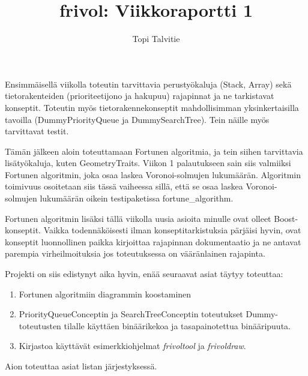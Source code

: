 \documentclass[a4paper, 11pt, finnish]{article}
\author{Topi Talvitie}
\title{frivol: Viikkoraportti 1}
\begin{document}
\maketitle

Ensimmäisellä viikolla toteutin tarvittavia perustyökaluja (Stack, Array) sekä tietorakenteiden (prioriteetijono ja hakupuu) rajapinnat ja ne tarkistavat konseptit. Toteutin myös tietorakennekonseptit mahdollisimman yksinkertaisilla tavoilla (DummyPriorityQueue ja DummySearchTree). Tein näille myös tarvittavat testit.

Tämän jälkeen aloin toteuttamaan Fortunen algoritmia, ja tein siihen tarvittavia lisätyökaluja, kuten GeometryTraits. Viikon 1 palautukseen sain siis valmiiksi Fortunen algoritmin, joka osaa laskea Voronoi-solmujen lukumäärän. Algoritmin toimivuus osoitetaan siis tässä vaiheessa sillä, että se osaa laskea Voronoi-solmujen lukumäärän oikein testipaketissa fortune\_algorithm.

Fortunen algoritmin lisäksi tällä viikolla uusia asioita minulle ovat olleet Boost-konseptit. Vaikka todennäköisesti ilman konseptitarkistuksia pärjäisi hyvin, ovat konseptit luonnollinen paikka kirjoittaa rajapinnan dokumentaatio ja ne antavat parempia virheilmoituksia jos toteutuksessa on vääränlainen rajapinta.

Projekti on siis edistynyt aika hyvin, enää seuraavat asiat täytyy toteuttaa:
\begin{enumerate}
\item Fortunen algoritmiin diagrammin koostaminen
\item PriorityQueueConceptin ja SearchTreeConceptin toteutukset Dummy-toteutusten tilalle käyttäen binäärikekoa ja tasapainotettua binääripuuta.
\item Kirjastoa käyttävät esimerkkiohjelmat \emph{frivoltool} ja \emph{frivoldraw}.
\end{enumerate}
Aion toteuttaa asiat listan järjestyksessä.
\end{document}
